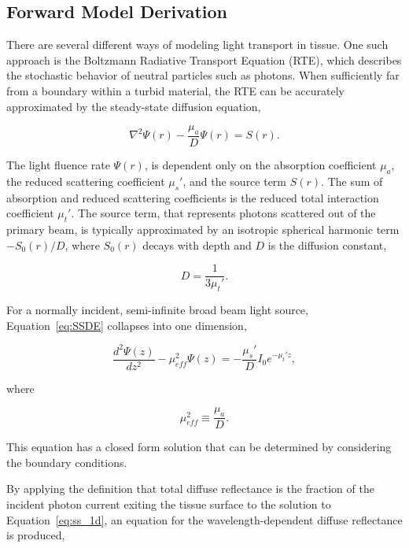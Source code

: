 \subsection{Forward Model Derivation}
\label{sec:forward_model}
There are several different ways of modeling light transport in tissue. One such approach is the Boltzmann Radiative Transport Equation (RTE), which describes the stochastic behavior of neutral particles such as photons.\cite{Duderstadt1976} When sufficiently far from a boundary within a turbid material, the RTE can be accurately approximated by the steady-state diffusion equation,\cite{Farrell1992}

\begin{equation}
\label{eq:SSDE}
	\nabla^2\Psi(r) - \frac{\mu_a}{D}\Psi(r) = S(r).
\end{equation}

The light fluence rate $\Psi(r)$, is dependent only on the absorption coefficient $\mu_a$, the reduced scattering coefficient $\mu_s'$, and the source term $S(r)$. The sum of absorption and reduced scattering coefficients is the reduced total interaction coefficient $\mu_t'$. The source term, that represents photons scattered out of the primary beam, is typically approximated by an isotropic spherical harmonic term $-S_0(r)/D$, where $S_0(r)$ decays with depth and $D$ is the diffusion constant,

\begin{equation}
	D = \frac{1}{3\mu_t'}.
\end{equation}

For a normally incident, semi-infinite broad beam light source, Equation~\ref{eq:SSDE} collapses into one dimension,

\begin{equation}
\label{eq:ss_1d}
	\frac{d^2\Psi(z)}{dz^2} - \mu_{eff}^2\Psi(z) = -\frac{\mu_s'}{D}I_0e^{-\mu_t'z},
\end{equation}

where

\begin{equation}
\mu_{eff}^2 \equiv \frac{\mu_a}{D}.
\end{equation}

This equation has a closed form solution that can be determined by considering the boundary conditions.\cite{Farrell1992}

By applying the definition that total diffuse reflectance is the fraction of the incident photon current exiting the tissue surface to the solution to Equation~\ref{eq:ss_1d}, an equation for the wavelength-dependent diffuse reflectance is produced,


